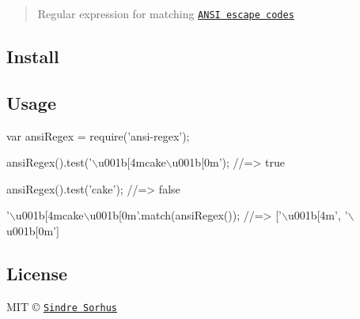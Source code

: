 \begin{quote}
Regular expression for matching \href{http://en.wikipedia.org/wiki/ANSI_escape_code}{\tt A\+N\+S\+I escape codes} \end{quote}


\subsection*{Install}




\subsection*{Usage}


\begin{DoxyCode}
var ansiRegex = require(\textcolor{stringliteral}{'ansi-regex'});

ansiRegex().test(\textcolor{stringliteral}{'\(\backslash\)u001b[4mcake\(\backslash\)u001b[0m'});
\textcolor{comment}{//=> true}

ansiRegex().test(\textcolor{stringliteral}{'cake'});
\textcolor{comment}{//=> false}

\textcolor{stringliteral}{'\(\backslash\)u001b[4mcake\(\backslash\)u001b[0m'}.match(ansiRegex());
\textcolor{comment}{//=> ['\(\backslash\)u001b[4m', '\(\backslash\)u001b[0m']}
\end{DoxyCode}


\subsection*{License}

M\+I\+T © \href{http://sindresorhus.com}{\tt Sindre Sorhus} 
